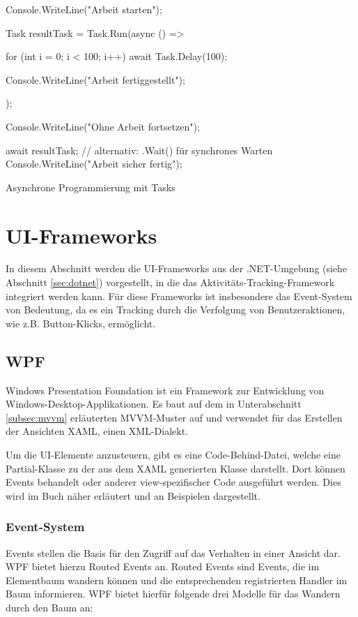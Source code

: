 \begin{program}[H]
\begin{CsCode}
Console.WriteLine("Arbeit starten");

Task resultTask = Task.Run(async () =>
{
    for (int i = 0; i < 100; i++)
        await Task.Delay(100);

    Console.WriteLine("Arbeit fertiggestellt");
});

Console.WriteLine("Ohne Arbeit fortsetzen");

await resultTask; // alternativ: .Wait() für synchrones Warten
Console.WriteLine("Arbeit sicher fertig");
\end{CsCode}
\caption{Asynchrone Programmierung mit Tasks}
\label{prog:aync_task_based}
\end{program}

\section{UI-Frameworks}
\label{sec:ui_frameworks}
In diesem Abschnitt werden die UI-Frameworks aus der .NET-Umgebung (siehe Abschnitt \ref{sec:dotnet}) vorgestellt, in die das Aktivitäts-Tracking-Framework integriert werden kann. Für diese Frameworks ist insbesondere das Event-System von Bedeutung, da es ein Tracking durch die Verfolgung von Benutzeraktionen, wie z.B. Button-Klicks, ermöglicht.

\subsection{WPF}
\label{subsec:WPF}
Windows Presentation Foundation \cite{microsoft_wpf_overview} ist ein Framework zur Entwicklung von Windows-Desktop-Applikationen. Es baut auf dem in Unterabschnitt \ref{subsec:mvvm} erläuterten MVVM-Muster auf und verwendet für das Erstellen der Ansichten XAML, einen XML-Dialekt. 

Um die UI-Elemente anzusteuern, gibt es eine Code-Behind-Datei, welche eine Partial-Klasse zu der aus dem XAML generierten Klasse darstellt. Dort können Events behandelt oder anderer view-spezifischer Code ausgeführt werden. Dies wird im Buch \cite{james2015pro} näher erläutert und an Beispielen dargestellt.

\subsubsection{Event-System}
Events stellen die Basis für den Zugriff auf das Verhalten in einer Ansicht dar. WPF bietet hierzu Routed Events \cite{microsoft_wpf_routed_events_overview} an. Routed Events sind Events, die im Elementbaum wandern können und die entsprechenden registrierten Handler im Baum informieren. WPF bietet hierfür folgende drei Modelle für das Wandern durch den Baum an:

